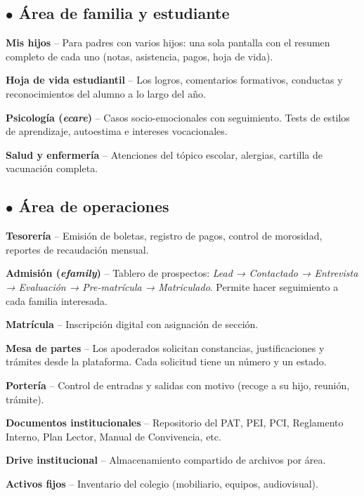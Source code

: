 \documentclass[11pt,a4paper]{article}
\begin{document}
\subsection*{\textcolor{merBlue}{$\bullet$} Área de familia y estudiante}
\begin{plainbox}
\textbf{Mis hijos} -- Para padres con varios hijos: una sola pantalla con el resumen completo de cada uno (notas, asistencia, pagos, hoja de vida).

\textbf{Hoja de vida estudiantil} -- Los logros, comentarios formativos, conductas y reconocimientos del alumno a lo largo del año.

\textbf{Psicología (\textit{ecare})} -- Casos socio-emocionales con seguimiento. Tests de estilos de aprendizaje, autoestima e intereses vocacionales.

\textbf{Salud y enfermería} -- Atenciones del tópico escolar, alergias, cartilla de vacunación completa.
\end{plainbox}

\subsection*{\textcolor{merBlue}{$\bullet$} Área de operaciones}
\begin{plainbox}
\textbf{Tesorería} -- Emisión de boletas, registro de pagos, control de morosidad, reportes de recaudación mensual.

\textbf{Admisión (\textit{efamily})} -- Tablero de prospectos: \textit{Lead → Contactado → Entrevista → Evaluación → Pre-matrícula → Matriculado}. Permite hacer seguimiento a cada familia interesada.

\textbf{Matrícula} -- Inscripción digital con asignación de sección.

\textbf{Mesa de partes} -- Los apoderados solicitan constancias, justificaciones y trámites desde la plataforma. Cada solicitud tiene un número y un estado.

\textbf{Portería} -- Control de entradas y salidas con motivo (recoge a su hijo, reunión, trámite).

\textbf{Documentos institucionales} -- Repositorio del PAT, PEI, PCI, Reglamento Interno, Plan Lector, Manual de Convivencia, etc.

\textbf{Drive institucional} -- Almacenamiento compartido de archivos por área.

\textbf{Activos fijos} -- Inventario del colegio (mobiliario, equipos, audiovisual).
\end{plainbox}
\end{document}
